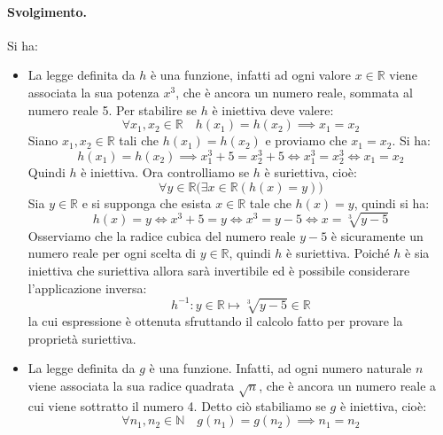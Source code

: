 \paragraph*{Svolgimento.} Si ha:
\begin{itemize}
	\item La legge definita da $h$ è una funzione, infatti ad ogni valore $x \in \mathbb{R}$ viene associata la sua potenza $x^{3}$, che è ancora un numero reale, sommata al numero reale 5. Per stabilire se $h$ è iniettiva deve valere:
	\begin{displaymath}
		\forall x_{1},x_{2} \in \mathbb{R} \quad h(x_{1})=h(x_{2}) \implies x_{1}=x_{2}
	\end{displaymath}
	Siano $x_{1},x_{2}\in \mathbb{R}$ tali che $h(x_{1})=h(x_{2})$ e proviamo che $x_{1}=x_{2}$. Si ha:
	\begin{displaymath}
		h(x_{1}) = h(x_{2}) \implies x_{1}^{3}+5 =x_{2}^{3}+5 \iff x_{1}^{3}=x_{2}^{3} \iff x_{1}=x_{2}
	\end{displaymath}
	Quindi $h$ è iniettiva. Ora controlliamo se $h$ è suriettiva, cioè:
	\begin{displaymath}
		\forall y \in \mathbb{R} \bigl( \exists x \in \mathbb{R} (h(x)=y) \bigr)
	\end{displaymath}
	Sia $y\in \mathbb{R}$ e si supponga che esista $x \in \mathbb{R}$ tale che $h(x) = y$, quindi si ha:
	\begin{displaymath}
		h(x)=y \iff x^{3}+5 =  y \iff x^{3}=y-5 \iff x= \sqrt[3]{y-5}
	\end{displaymath}
	Osserviamo che la radice cubica del numero reale $y-5$ è sicuramente un numero reale per ogni scelta di $y \in \mathbb{R}$, quindi $h$ è suriettiva. Poiché $h$ è sia iniettiva che suriettiva allora sarà invertibile ed è possibile considerare l'applicazione inversa:
	\begin{displaymath}
		h^{-1}: y \in \mathbb{R} \mapsto \sqrt[3]{y-5} \in \mathbb{R}
	\end{displaymath}
	la cui espressione è ottenuta sfruttando il calcolo fatto per provare la proprietà suriettiva.
	\item La legge definita da $g$ è una funzione. Infatti, ad ogni numero naturale $n$ viene associata la sua radice quadrata $\sqrt{n}$, che è ancora un numero reale a cui viene sottratto il numero 4. Detto ciò stabiliamo se $g$ è iniettiva, cioè:
	\begin{displaymath}
		\forall n_{1},n_{2} \in \mathbb{N} \quad g(n_{1})= g(n_{2}) \implies n_{1}=n_{2}
	\end{displaymath}

\end{itemize}
